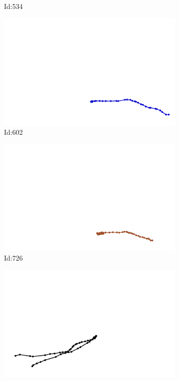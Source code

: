 \documentclass[12pt,twoside]{report}
\begin{document}
\begin{figure}
\begin{subfigure}[b]{0.20\textwidth}
\caption{Id:534}
\end{subfigure}
\begin{subfigure}[b]{0.20\textwidth}
\centering
\includegraphics[width=\textwidth]{../trajectories/602.png}
\caption{Id:602}
\end{subfigure}
\begin{subfigure}[b]{0.20\textwidth}
\centering
\includegraphics[width=\textwidth]{../trajectories/726.png}
\caption{Id:726}
\end{subfigure}
\begin{subfigure}[b]{0.20\textwidth}
\centering
\includegraphics[width=\textwidth]{../trajectories/780.png}

\end{subfigure}
\end{figure}
\end{document}

